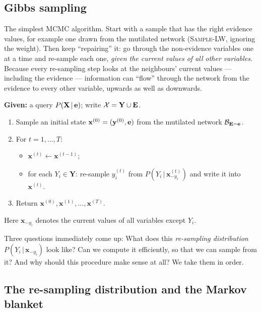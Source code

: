 \documentclass[11pt, oneside]{book}
\newcommand{\Prob}{\mathbb{P}}           %
\newcommand{\given}{\,\vert\,}           %
\newcommand{\Xall}{\mathcal{X}}          %
\newcommand{\bX}{\mathbf{X}}  \newcommand{\bY}{\mathbf{Y}}
\newcommand{\bx}{\mathbf{x}}  \newcommand{\by}{\mathbf{y}}
\let\originalsubsection\subsection
\renewcommand{\subsection}{\Needspace{6\baselineskip}\originalsubsection}
\begin{document}
\subsection{Gibbs sampling}
\label{sec:gibbs}

The simplest MCMC algorithm. Start with a sample that has the right evidence
values, for example one drawn from the mutilated network (\textsc{Sample-LW},
ignoring the weight). Then keep ``repairing'' it: go through the non-evidence
variables one at a time and re-sample each one, \emph{given the current
values of all other variables}. Because every re-sampling step looks at the
neighbours' current values --- including the evidence --- information can
``flow'' through the network from the evidence to every other variable,
upwards as well as downwards.

\begin{thmbox}[title={Gibbs sampling}, unbreakable]
\textbf{Given:} a query $P(\bX \given \be)$; write $\Xall = \bY \cup \bE$.
\begin{enumerate}
  \item Sample an initial state $\bx^{(0)} = (\by^{(0)}, \be)$ from the
    mutilated network $\mathcal{B}_{\mathbf{E} = \mathbf{e}}$.
  \item For $t = 1, \ldots, T$:
  \begin{itemize}
    \item $\bx^{(t)} \leftarrow \bx^{(t-1)}$;
    \item for each $Y_i \in \bY$: re-sample $y_i^{(t)}$ from $P(Y_i \given
      \bx^{(t)}_{-y_i})$ and write it into $\bx^{(t)}$.
  \end{itemize}
  \item Return $\bx^{(0)}, \bx^{(1)}, \ldots, \bx^{(T)}$.
\end{enumerate}
Here $\bx_{-y_i}$ denotes the current values of all variables except $Y_i$.
\end{thmbox}

Three questions immediately come up: What does this \emph{re-sampling
distribution} $P(Y_i \given \bx_{-y_i})$ look like? Can we compute it
efficiently, so that we can sample from it? And why should this procedure
make sense at all? We take them in order.

\subsection{The re-sampling distribution and the Markov blanket}
\end{document}
